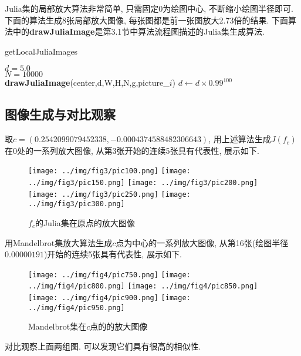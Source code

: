 \documentclass[UTF8]{ctexart}
\begin{document}
Julia集的局部放大算法非常简单, 只需固定$0$为绘图中心, 不断缩小绘图半径即可. 下面的算法生成8张局部放大图像, 每张图都是前一张图放大2.73倍的结果. 下面算法中的\textbf{drawJuliaImage}是第3.1节中算法流程图描述的Julia集生成算法.

\begin{algorithm}[H]
	\caption{getLocalJuliaImages}
	\small
	
    $d=5.0$\\
    $N=10000$\\
	{
        \textbf{drawJuliaImage}(center,d,W,H,N,g,picture\_$i$)
        $d\gets d \times 0.99^{100}$
	}
\end{algorithm}

\subsection{图像生成与对比观察}

取$c=(0.2542099079452338,-0.0004374588482306643)$, 用上述算法生成$J(f_c)$在$0$处的一系列放大图像, 从第3张开始的连续5张具有代表性, 展示如下.

\begin{figure}[H]
    \centering
    \texttt{[image: ../img/fig3/pic100.png]}
    \texttt{[image: ../img/fig3/pic150.png]}
    \texttt{[image: ../img/fig3/pic200.png]}
    \texttt{[image: ../img/fig3/pic250.png]}
    \texttt{[image: ../img/fig3/pic300.png]}
    \caption{$f_c$的Julia集在原点的放大图像}
\end{figure}

用Mandelbrot集放大算法生成$c$点为中心的一系列放大图像, 从第16张(绘图半径$0.00000191$)开始的连续5张具有代表性, 展示如下.

\begin{figure}[H]
    \centering
    \texttt{[image: ../img/fig4/pic750.png]}
    \texttt{[image: ../img/fig4/pic800.png]}
    \texttt{[image: ../img/fig4/pic850.png]}
    \texttt{[image: ../img/fig4/pic900.png]}
    \texttt{[image: ../img/fig4/pic950.png]}
    \caption{Mandelbrot集在$c$点的的放大图像}
\end{figure}

对比观察上面两组图. 可以发现它们具有很高的相似性.
\end{document}
